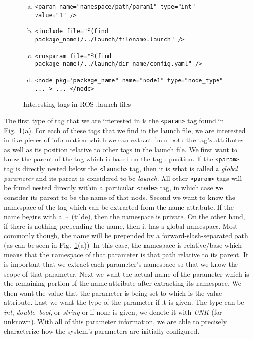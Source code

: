 \begin{figure}
	\begin{enumerate}[(a)]
		\item \texttt{<param name="namespace/path/param1" type="int" value="1" />}
		\item \texttt{<include file="$\$$(find package\_name)/../launch/filename.launch" />}
		\item \texttt{<rosparam file="$\$$(find package\_name)/../launch/dir\_name/config.yaml" />}
		\item \texttt{<node pkg="package\_name" name="node1" type="node\_type" ... > ... </node>}
	\end{enumerate}
	\caption{Interesting tags in ROS .launch files}
	\label{fig:launchtags}
\end{figure}

The first type of tag that we are interested in is the \texttt{<param>} tag found in Fig.~\ref{fig:launchtags}(a). For each of these tags that we find in the launch file, we are interested in five pieces of information which we can extract from both the tag's attributes as well as its position relative to other tags in the launch file. We first want to know the parent of the tag which is based on the tag's position. If the \texttt{<param>} tag is directly nested below the \texttt{<launch>} tag, then it is what is called a \emph{global parameter} and its parent is considered to be \emph{launch}. All other \texttt{<param>} tags will be found nested directly within a particular \texttt{<node>} tag, in which case we consider its parent to be the name of that node. Second we want to know the namespace of the tag which can be extracted from the name attribute. If the name begins with a $\sim$ (tilde), then the namespace is private. On the other hand, if there is nothing prepending the name, then it has a global namespace. Most commonly though, the name will be prepended by a forward-slash-separated path (as can be seen in Fig.~\ref{fig:launchtags}(a)). In this case, the namespace is relative/base which means that the namespace of that parameter is that path relative to its parent. It is important that we extract each parameter's namespace so that we know the scope of that parameter. Next we want the actual name of the parameter which is the remaining portion of the name attribute after extracting its namespace. We then want the value that the parameter is being set to which is the value attribute. Last we want the type of the parameter if it is given. The type can be \emph{int}, \emph{double}, \emph{bool}, or \emph{string} or if none is given, we denote it with \emph{UNK} (for unknown). With all of this parameter information, we are able to precisely characterize how the system's parameters are initially configured.

